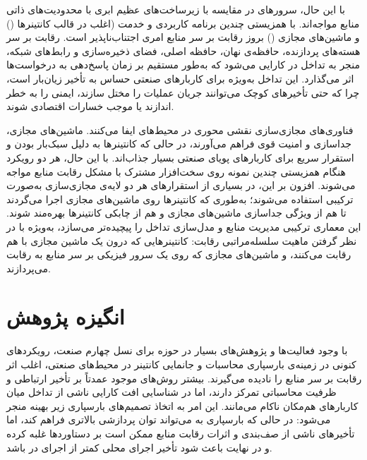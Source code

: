 با این حال، سرورهای  در مقایسه با زیرساخت‌های عظیم ابری با محدودیت‌های ذاتی منابع مواجه‌اند. با همزیستی چندین برنامه کاربردی و خدمت (اغلب در قالب کانتینرها () و ماشین‌های مجازی () بروز رقابت بر سر منابع امری اجتناب‌ناپذیر است. رقابت بر سر هسته‌های پردازنده، حافظه‌ی نهان، حافظه اصلی، فضای ذخیره‌سازی و رابط‌های شبکه، منجر به تداخل در کارایی می‌شود که به‌طور مستقیم بر زمان پاسخ‌دهی به درخواست‌ها اثر می‌گذارد. این تداخل به‌ویژه برای کاربارهای صنعتی حساس به تأخیر زیان‌بار است، چرا که حتی تأخیرهای کوچک می‌توانند جریان عملیات را مختل سازند، ایمنی را به خطر اندازند یا موجب خسارات اقتصادی شوند.

فناوری‌های مجازی‌سازی نقشی محوری در محیط‌های  ایفا می‌کنند. ماشین‌های مجازی، جداسازی و امنیت قوی فراهم می‌آورند، در حالی که کانتینرها به دلیل سبک‌بار بودن و استقرار سریع برای کاربارهای پویای صنعتی بسیار جذاب‌اند. با این حال، هر دو رویکرد هنگام همزیستی چندین نمونه روی سخت‌افزار مشترک با مشکل رقابت منابع مواجه می‌شوند. افزون بر این، در بسیاری از استقرارهای  هر دو لایه‌ی مجازی‌سازی به‌صورت ترکیبی استفاده می‌شوند؛ به‌طوری که کانتینرها روی ماشین‌های مجازی اجرا می‌گردند تا هم از ویژگی جداسازی ماشین‌های مجازی و هم از چابکی کانتینرها بهره‌مند شوند. این معماری ترکیبی مدیریت منابع و مدل‌سازی تداخل را پیچیده‌تر می‌سازد، به‌ویژه با در نظر گرفتن ماهیت سلسله‌مراتبی رقابت: کانتینرهایی که درون یک ماشین مجازی با هم رقابت می‌کنند، و ماشین‌های مجازی که روی یک سرور فیزیکی  بر سر منابع به رقابت می‌پردازند.

\section{انگیزه پژوهش}

با وجود فعالیت‌ها و پژوهش‌های بسیار در حوزه  برای نسل چهارم صنعت، رویکردهای کنونی در زمینه‌ی بارسپاری محاسبات و جانمایی کانتینر در محیط‌های صنعتی، اغلب اثر رقابت بر سر منابع را نادیده می‌گیرند. بیشتر روش‌های موجود عمدتاً بر تأخیر ارتباطی و ظرفیت محاسباتی تمرکز دارند، اما در شناسایی افت کارایی ناشی از تداخل میان کاربارهای هم‌مکان ناکام می‌مانند. این امر به اتخاذ تصمیم‌های بارسپاری زیر بهینه منجر می‌شود: در حالی که بارسپاری به  می‌تواند توان پردازشی بالاتری فراهم کند، اما تأخیرهای ناشی از صف‌بندی و اثرات رقابت منابع ممکن است بر دستاوردها غلبه کرده و در نهایت باعث شود تأخیر اجرای محلی کمتر از اجرای در  باشد.

